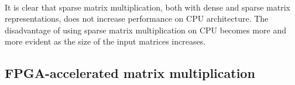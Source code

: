 \begin{table}[t]
\centering
    \\[10pt]
    \caption[Benchmark of \textit{torch.mm} PyTorch function]{Benchmark of \textit{torch.mm} PyTorch function. Five runs using different number of executions and their average, unit of measure is second.}
    \label{tab:torch-mm-benchmark}
\end{table}


It is clear that sparse matrix multiplication, both with dense and sparse matrix representations, does not increase performance on CPU architecture.
The disadvantage of using sparse matrix multiplication on CPU becomes more and more evident as the size of the input matrices increases.

\subsection{FPGA-accelerated matrix multiplication}
\label{subsec:optimization-comparison}%

